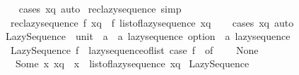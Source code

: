 \begin{isabellebody}
%
\isadelimproof
\ \ %
\endisadelimproof
%
\isatagproof
{}\isamarkupfalse%
\ {\isacharparenleft}{\kern0pt}cases\ xq{\isacharparenright}{\kern0pt}\ auto%
\endisatagproof
{\isafoldproof}%
%
\isadelimproof
\isanewline
%
\endisadelimproof
\isanewline
{}\isamarkupfalse%
\ rec{\isacharunderscore}{\kern0pt}lazy{\isacharunderscore}{\kern0pt}sequence\ {\isacharbrackleft}{\kern0pt}simp{\isacharbrackright}{\kern0pt}{\isacharcolon}{\kern0pt}\isanewline
\ \ {\isachardoublequoteopen}rec{\isacharunderscore}{\kern0pt}lazy{\isacharunderscore}{\kern0pt}sequence\ f\ xq\ {\isacharequal}{\kern0pt}\ f\ {\isacharparenleft}{\kern0pt}list{\isacharunderscore}{\kern0pt}of{\isacharunderscore}{\kern0pt}lazy{\isacharunderscore}{\kern0pt}sequence\ xq{\isacharparenright}{\kern0pt}{\isachardoublequoteclose}\isanewline
%
\isadelimproof
\ \ %
\endisadelimproof
%
\isatagproof
{}\isamarkupfalse%
\ {\isacharparenleft}{\kern0pt}cases\ xq{\isacharparenright}{\kern0pt}\ auto%
\endisatagproof
{\isafoldproof}%
%
\isadelimproof
\isanewline
%
\endisadelimproof
\isanewline
{}\isamarkupfalse%
\ Lazy{\isacharunderscore}{\kern0pt}Sequence\ {\isacharcolon}{\kern0pt}{\isacharcolon}{\kern0pt}\ {\isachardoublequoteopen}{\isacharparenleft}{\kern0pt}unit\ {\isasymRightarrow}\ {\isacharparenleft}{\kern0pt}{\isacharprime}{\kern0pt}a\ {\isasymtimes}\ {\isacharprime}{\kern0pt}a\ lazy{\isacharunderscore}{\kern0pt}sequence{\isacharparenright}{\kern0pt}\ option{\isacharparenright}{\kern0pt}\ {\isasymRightarrow}\ {\isacharprime}{\kern0pt}a\ lazy{\isacharunderscore}{\kern0pt}sequence{\isachardoublequoteclose}\isanewline
{}\isanewline
\ \ {\isachardoublequoteopen}Lazy{\isacharunderscore}{\kern0pt}Sequence\ f\ {\isacharequal}{\kern0pt}\ lazy{\isacharunderscore}{\kern0pt}sequence{\isacharunderscore}{\kern0pt}of{\isacharunderscore}{\kern0pt}list\ {\isacharparenleft}{\kern0pt}case\ f\ {\isacharparenleft}{\kern0pt}{\isacharparenright}{\kern0pt}\ of\isanewline
\ \ \ \ None\ {\isasymRightarrow}\ {\isacharbrackleft}{\kern0pt}{\isacharbrackright}{\kern0pt}\isanewline
\ \ {\isacharbar}{\kern0pt}\ Some\ {\isacharparenleft}{\kern0pt}x{\isacharcomma}{\kern0pt}\ xq{\isacharparenright}{\kern0pt}\ {\isasymRightarrow}\ x\ {\isacharhash}{\kern0pt}\ list{\isacharunderscore}{\kern0pt}of{\isacharunderscore}{\kern0pt}lazy{\isacharunderscore}{\kern0pt}sequence\ xq{\isacharparenright}{\kern0pt}{\isachardoublequoteclose}\isanewline
\isanewline
{}\isamarkupfalse%
\ Lazy{\isacharunderscore}{\kern0pt}Sequence\isanewline

\end{isabellebody}
